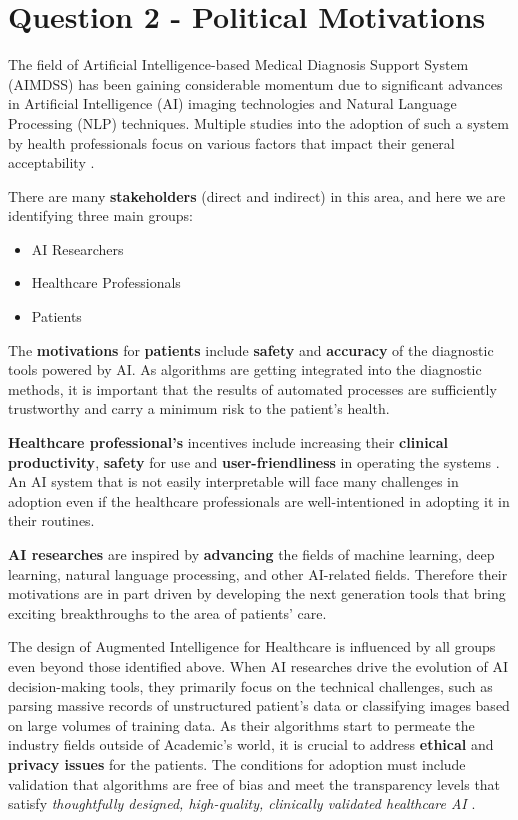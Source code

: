 \documentclass[12pt,letterpaper]{article}
\begin{document}
\section*{Question 2 - Political Motivations}

The field of Artificial Intelligence-based Medical Diagnosis Support System (AIMDSS) has been gaining considerable momentum due to significant advances in Artificial Intelligence (AI) imaging technologies and Natural Language Processing (NLP) techniques. Multiple studies into the adoption of such a system by health professionals focus on various factors that impact their general acceptability \cite{fan2018investigating}.

There are many \textbf{stakeholders} (direct and indirect) in this area, and here we are identifying three main groups:

\begin{itemize}
    \item AI Researchers
    \item Healthcare Professionals
    \item Patients 
\end{itemize}

The \textbf{motivations} for \textbf{patients} include \textbf{safety} and \textbf{accuracy} of the diagnostic tools powered by AI. As algorithms are getting integrated into the diagnostic methods, it is important that the results of automated processes are sufficiently trustworthy and carry a minimum risk to the patient's health. 

\textbf{Healthcare professional's} incentives include increasing their \textbf{clinical productivity}, \textbf{safety} for use and \textbf{user-friendliness} in operating the systems \cite{ishak2002artificial}. An AI system that is not easily interpretable will face many challenges in adoption even if the healthcare professionals are well-intentioned in adopting it in their routines. 

\textbf{AI researches} are inspired by \textbf{advancing} the fields of machine learning, deep learning, natural language processing, and other AI-related fields. Therefore their motivations are in part driven by developing the next generation tools that bring exciting breakthroughs to the area of patients' care.

The design of Augmented Intelligence for Healthcare is influenced by all groups even beyond those identified above. When AI researches drive the evolution of AI decision-making tools, they primarily focus on the technical challenges, such as parsing massive records of unstructured patient's data or classifying images based on large volumes of training data. As their algorithms start to permeate the industry fields outside of Academic's world, it is crucial to address \textbf{ethical} and \textbf{privacy issues} for the patients. The conditions for adoption must include validation that algorithms are free of bias and meet the transparency levels that satisfy \textit{thoughtfully designed, high-quality, clinically validated healthcare AI} \cite{blog:healthitanalytics}.
\end{document}
